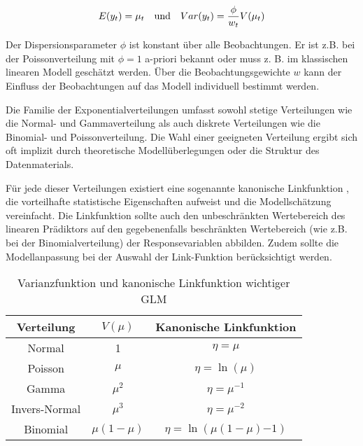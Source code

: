 \begin{eqnarray} \label{eq:4}
E(y_t) = \mu_t \quad \textnormal{und} \quad Var(y_t) = \frac{\phi}{w_t}V(\mu_t)
\end{eqnarray}

Der Dispersionsparameter $\phi$  ist konstant über alle Beobachtungen. Er ist z.B. bei der Poissonverteilung mit $\phi=1$  a-priori bekannt oder muss z. B. im klassischen linearen Modell geschätzt werden. Über die Beobachtungsgewichte $w$  kann der Einfluss der Beobachtungen auf das Modell individuell bestimmt werden.

Die Familie der Exponentialverteilungen umfasst sowohl stetige Verteilungen wie die Normal- und Gammaverteilung als auch diskrete Verteilungen wie die Binomial- und Poissonverteilung. Die Wahl einer geeigneten Verteilung ergibt sich oft implizit durch theoretische Modellüberlegungen oder die Struktur des Datenmaterials.

Für jede dieser Verteilungen existiert eine sogenannte kanonische Linkfunktion , die vorteilhafte statistische Eigenschaften aufweist und die Modellschätzung vereinfacht. Die Linkfunktion sollte auch den unbeschränkten Wertebereich des linearen Prädiktors auf den gegebenenfalls beschränkten Wertebereich (wie z.B. bei der Binomialverteilung) der Responsevariablen abbilden. Zudem sollte die Modellanpassung bei der Auswahl der Link-Funktion berücksichtigt werden.



\begin{table}
 \caption{Varianzfunktion und kanonische Linkfunktion wichtiger GLM}

\begin{center}
\begin{tabular}{c|c|c}
    Verteilung     &     $V(\mu)$    &   Kanonische Linkfunktion \\ \hline
Normal		  &  1                   &  $\eta = \mu$ \\
Poisson		  &  $\mu$            &  $\eta = \ln(\mu)$ \\
Gamma		  &  $\mu^2$        &  $\eta = \mu^{-1}$ \\
Invers-Normal	  &  $\mu^3$        &  $\eta = \mu^{-2}$ \\
Binomial		  &  $\mu(1-\mu)$ &  $\eta = \ln(\mu(1-\mu){-1})$ \\

\end{tabular}
\end{center}

\label{tab:Linkfunktion}
 \end{table}

